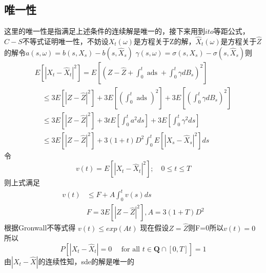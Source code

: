 \documentclass{article}%
\begin{document}
		\subsection{唯一性}
		这里的唯一性是指满足上述条件的连续解是唯一的，接下来用到$ito$等距公式，$C-S$不等式证明唯一性，不妨设$X_t(\omega)$是方程关于Z的解，$\widehat{X}_t(\omega)$是方程关于$\widehat{Z}$的解令$a(s, \omega)=b\left(s, X_{s}\right)-b\left(s, \hat{X}_{s}\right)$ $\gamma(s, \omega)=\sigma\left(s, X_{s}\right)-\sigma\left(s, \widehat{X}_{s}\right)$则
		\begin{equation}
		\begin{array}{l}
		E\left[\left|X_{t}-\widehat{X}_{t}\right|^{2}\right]=E\left[\left(Z-\widehat{Z}+\int_{0}^{t} \operatorname{ads}+\int_{0}^{t} \gamma d B_{s}\right)^{2}\right] \\
		\quad \leq 3 E\left[|Z-\widehat{Z}|^{2}\right]+3 E\left[\left(\int_{0}^{t} \text { ads }\right)^{2}\right]+3 E\left[\left(\int_{0}^{t} \gamma d B_{s}\right)^{2}\right] \\
		\quad \leq 3 E\left[|Z-\widehat{Z}|^{2}\right]+3 t E\left[\int_{0}^{t} a^{2} d s\right]+3 E\left[\int_{0}^{t} \gamma^{2} d s\right] \\
		\quad \leq 3 E\left[|Z-\widehat{Z}|^{2}\right]+3(1+t) D^{2} \int_{0}^{t} E\left[\left|X_{s}-\hat{X}_{s}\right|^{2}\right] d s
		\end{array}
		\end{equation}
		令
		$$
		v(t)=E\left[\left|X_{t}-\hat{X}_{t}\right|^{2}\right] ; \quad 0 \leq t \leq T
		$$
		则上式满足
		\begin{equation}
		\begin{aligned}
		v(t) & \leq F+A \int_{0}^{t} v(s) d s \\
		&  F=3 E\left[|Z-\widehat{Z}|^{2}\right] ,A=3(1+T) D^{2}
		\end{aligned}
		\end{equation}
		根据Gronwall不等式得
		$v(t)\leq exp(At)$
		现在假设$Z=\widehat{Z}$则F=0所以$v(t)=0$所以
		$$
		P\left[\left|X_{t}-\hat{X}_{t}\right|=0 \quad \text { for all } t \in \mathbf{Q} \cap[0, T]\right]=1
		$$
		由$|X_t-\widehat{X}|$的连续性知，sde的解是唯一的
\end{document}
